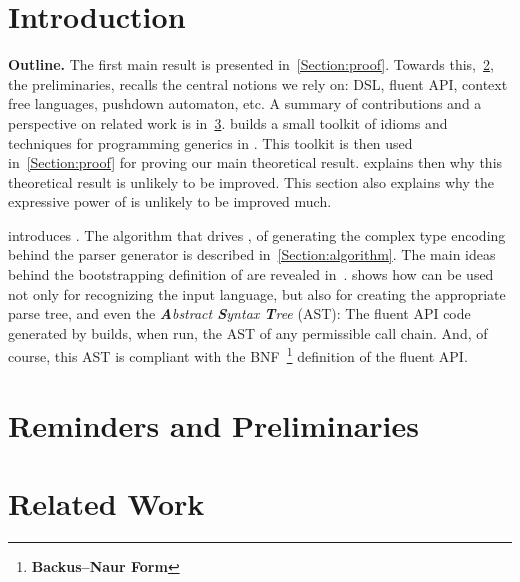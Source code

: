 \documentclass[a4paper,USenglish]{lipics}
\author{Anonymized for the submission}
\begin{document}
\maketitle
\begin{abstract}
  
\end{abstract}

\section{Introduction}


\textbf{Outline.}
The first main result is presented in~\cref{Section:proof}.
Towards this,~\cref{Section:preliminaries}, the preliminaries, 
  recalls the central notions we rely on: DSL, fluent API,
  context free languages, pushdown automaton, etc. 
A summary of contributions and a perspective on related work is
  in~\cref{Section:related}.
 builds a small toolkit of idioms and techniques
  for programming generics in \Java.
This toolkit is then used in~\cref{Section:proof} for
  proving our main theoretical result.
 explains then why
  this theoretical result is unlikely to be improved.
This section also explains why the expressive power of \Self
  is unlikely to be improved much.

 introduces \Self.
The algorithm that drives \Self, of generating the complex
  type encoding behind the parser generator
  is described in~\cref{Section:algorithm}.
The main ideas behind the bootstrapping definition of \Self
  are revealed in~.
 shows how \Self can be used not only
  for recognizing the input language,
  but also for creating the appropriate parse tree, and even the \emph{\textbf Abstract \textbf Syntax \textbf Tree} (AST):
  The fluent API code generated by \Self builds,
    when run, the AST of any permissible call chain.
    And, of course, this AST is compliant with the BNF~\footnote{\textbf{Backus–Naur Form}} definition
      of the fluent API.

\section{Reminders and Preliminaries}
\label{Section:preliminaries}


\section{Related Work}
\label{Section:related}
%
\end{document}
